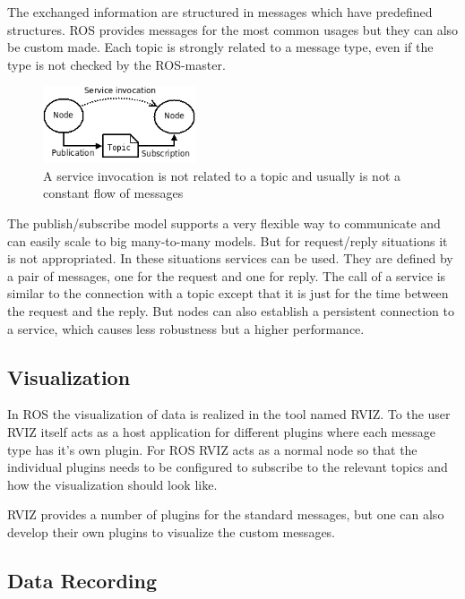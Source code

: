 The exchanged information are structured in messages which have predefined structures.
ROS provides messages for the most common usages but they can also be custom made.
Each topic is strongly related to a message type, even if the type is not checked by the ROS-master.

\begin{figure}
    \centering
    \includegraphics[width=0.4\textwidth]{img/ros_master/service.png}

    \caption{A service invocation is not related to a topic and usually is not a constant flow of messages}
    \label{fig:service_invocation}
\end{figure}

The publish/subscribe model supports a very flexible way to communicate and can easily scale to big many-to-many models.
But for request/reply situations it is not appropriated.
In these situations services can be used.
They are defined by a pair of messages, one for the request and one for reply.
The call of a service is similar to the connection with a topic except that it is just for the time between the request and the reply.
But nodes can also establish a persistent connection to a service, which causes less robustness but a higher performance.

\subsection{Visualization}\label{ssec:visualization}

In ROS the visualization of data is realized in the tool named RVIZ.
To the user RVIZ itself acts as a host application for different plugins where each message type has it's own plugin.
For ROS RVIZ acts as a normal node so that the individual plugins needs to be configured to subscribe to the relevant topics and how the visualization should look like.

RVIZ provides a number of plugins for the standard messages, but one can also develop their own plugins to visualize the custom messages.

\subsection{Data Recording}\label{ssec:dataRecording}

